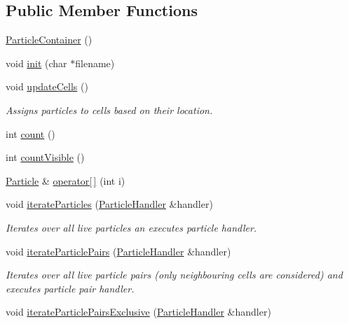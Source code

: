 \subsection*{Public Member Functions}
\begin{DoxyCompactItemize}
\item 
\hyperlink{classSimulation_1_1ParticleContainer_a76d21bdb5141158cf664d65e2d8b1db7}{Particle\-Container} ()
\item 
void \hyperlink{classSimulation_1_1ParticleContainer_a2bdf40eb2fab6e85afddf69d6ef43f27}{init} (char $\ast$filename)
\item 
void \hyperlink{classSimulation_1_1ParticleContainer_af3b7b2d3c26a67a390857a8aa0c8b31b}{update\-Cells} ()
\begin{DoxyCompactList}\small\item\em Assigns particles to cells based on their location. \end{DoxyCompactList}\item 
int \hyperlink{classSimulation_1_1ParticleContainer_a8a7a0979f6d714977491fe14529004ee}{count} ()
\item 
int \hyperlink{classSimulation_1_1ParticleContainer_a5d3d7a52a8a5fe0db99e6e424c83d3bf}{count\-Visible} ()
\item 
\hyperlink{classSimulation_1_1Particle}{Particle} \& \hyperlink{classSimulation_1_1ParticleContainer_a691b50db5c7d2fce6d2576c0b51b4ea9}{operator\mbox{[}$\,$\mbox{]}} (int i)
\item 
void \hyperlink{classSimulation_1_1ParticleContainer_a13b3ada63172c5070e81235bc16801ca}{iterate\-Particles} (\hyperlink{classSimulation_1_1ParticleHandler}{Particle\-Handler} \&handler)
\begin{DoxyCompactList}\small\item\em Iterates over all live particles an executes particle handler. \end{DoxyCompactList}\item 
void \hyperlink{classSimulation_1_1ParticleContainer_a2d7f15f3d5cb18cd08dadc8f01f2e04a}{iterate\-Particle\-Pairs} (\hyperlink{classSimulation_1_1ParticleHandler}{Particle\-Handler} \&handler)
\begin{DoxyCompactList}\small\item\em Iterates over all live particle pairs (only neighbouring cells are considered) and executes particle pair handler. \end{DoxyCompactList}\item 
void \hyperlink{classSimulation_1_1ParticleContainer_ab70a9d544a8428d7085863990bca1811}{iterate\-Particle\-Pairs\-Exclusive} (\hyperlink{classSimulation_1_1ParticleHandler}{Particle\-Handler} \&handler)

\end{DoxyCompactItemize}
